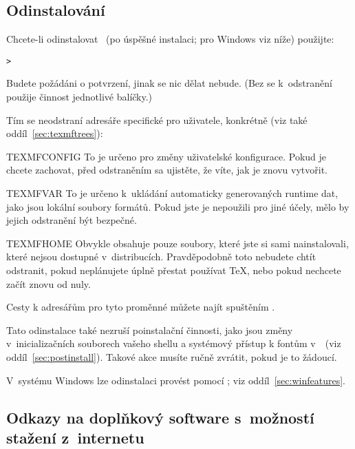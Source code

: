 \documentclass[\classoptions,slovak,english,czech]{\classname}
\begin{document}
\subsection{Odinstalování \TL}
\label{sec:uninstall}

Chcete-li odinstalovat \TL\ (po úspěšné instalaci; pro Windows viz
níže) použijte: 

\begin{alltt}
	> 
\end{alltt}

Budete požádáni o potvrzení, jinak se nic dělat nebude.
(Bez  se k~odstranění použije činnost 
jednotlivé balíčky.) 

Tím se neodstraní adresáře specifické pro uživatele, konkrétně (viz také
oddíl~\ref{sec:texmftrees}): 

\begin{ttdescription}
\item [TEXMFCONFIG] To je určeno pro změny uživatelské konfigurace.
Pokud je chcete zachovat, před odstraněním sa ujistěte, že víte, jak je znovu vytvořit. 
	
\item [TEXMFVAR] To je určeno k~ukládání automaticky generovaných runtime dat, 
jako jsou lokální soubory formátů. Pokud jste je nepoužili
pro jiné účely, mělo by jejich odstranění být bezpečné. 
	
\item[TEXMFHOME] Obvykle obsahuje pouze soubory, které jste si sami nainstalovali,
které nejsou dostupné v~distribucích. Pravděpodobně toto nebudete chtít odstranit, pokud neplánujete úplně
přestat používat \TeX, nebo pokud nechcete začít znovu od nuly.
\end{ttdescription}

\noindent Cesty k adresářům pro tyto proměnné můžete najít spuštěním .

Tato odinstalace  také nezruší poinstalační
činnosti, jako jsou změny  v~inicializačních souborech vašeho shellu 
a systémový přístup k fontům v~\TL\ (viz oddíl~\ref{sec:postinstall}). 
Takové akce musíte ručně zvrátit, pokud je to žádoucí. 

V~systému Windows lze odinstalaci provést pomocí \GUI; viz
oddíl~\ref{sec:winfeatures}. 


\subsection{Odkazy na doplňkový software s~možností stažení z~internetu}
\end{document}
